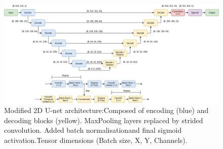 \documentclass[9pt]{beamer}
\begin{document}





\begin{frame}{}
\begin{figure}
\includegraphics[width=1.0\textwidth]{images/model_diagram}
\caption{Modified 2D U-net architecture:\footnotemark[8] Composed of encoding (blue) and decoding blocks (yellow). MaxPooling layers replaced by strided convolution\footnotemark[11]. Added batch normalisation\footnotemark[12] and final sigmoid activation.\footnotemark[3] Tensor dimensions (Batch size, X, Y, Channels).}
\end{figure}
\end{frame}
\end{document}

